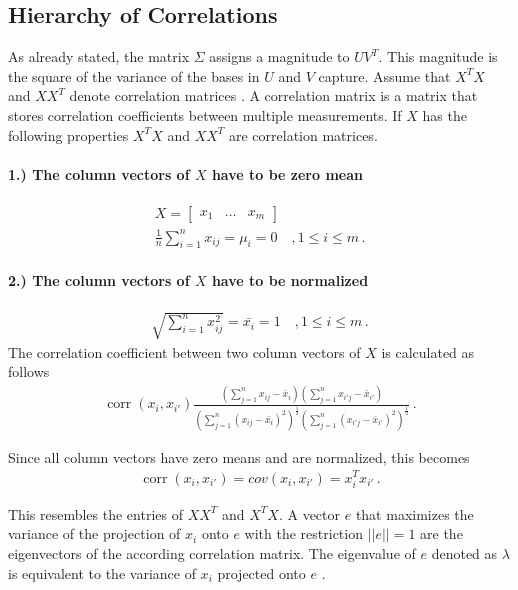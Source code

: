 \subsection{Hierarchy of Correlations}
As already stated, the matrix \(\Sigma\) assigns a magnitude to \(UV^{T}\).
This magnitude is the square of the variance of the bases in \(U\) and \(V\) capture.
Assume that \(X^{T}X\) and \(XX^{T}\) denote correlation matrices
\cite{brunton_kutz_2019b}.
A correlation matrix is a matrix that stores correlation coefficients between multiple measurements. 
If \(X\) has the following properties \(X^{T}X\) and \(XX^{T}\) are correlation matrices.
\paragraph{1.) The column vectors of \(X\) have to be zero mean}
\begin{gather}
X = \begin{bmatrix}
x_1 & \hdots & x_m
\end{bmatrix} \\
\frac{1}{n}\sum_{i = 1}^{n} x_{ij} = \mu_{i} = 0 \quad , 1 \leq i \leq m \,.
\end{gather}
\paragraph{2.) The column vectors of \(X\) have to be normalized}
\begin{gather}
\sqrt{\sum_{i = 1}^{n} x_{ij}^{2}} = \bar{x_i} = 1 \quad , 1 \leq i \leq m \,.
\end{gather}
The correlation coefficient between two column vectors of \(X\) is calculated as follows \cite{Suga}
\begin{gather}
\operatorname{corr}(x_i, x_{i'})\frac{(\sum_{j = 1}^{n} x_{ij} - \bar{x}_i)(\sum_{j = 1}^{n} x_{i'j} - \bar{x}_{i'})}{(\sum_{j = 1}^{n} (x_{ij}- \bar{x_{i}})^{2})^{\frac{1}{2}}(\sum_{j = 1}^{n} (x_{i'j}-  \bar{x}_{i'})^{2})^{\frac{1}{2}}} \,.
\end{gather}



Since all column vectors have zero means and are normalized, this becomes \cite{harv}
\begin{gather}
\operatorname{corr}(x_i, x_{i'}) = cov(x_i, x_{i'})= x_i^{T}x_{i'} \,.
\end{gather}

This resembles the entries of \(XX^{T}\) and \(X^{T}X\).
A vector \(e\) that maximizes the variance of the projection of \(x_i\) onto \(e\)  with the restriction \(||e|| = 1\) are the eigenvectors of the according correlation matrix.
The eigenvalue of \(e\) denoted as \(\lambda\) is equivalent to the variance of \(x_i\) projected onto \(e\) \cite{Lavrenko}.

